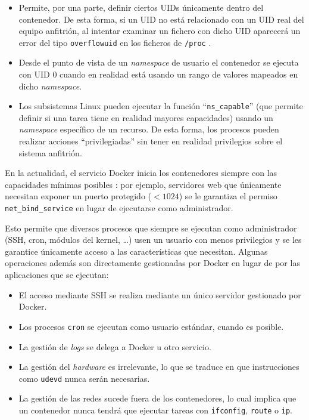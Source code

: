 \begin{itemize}
  \item Permite, por una parte, definir ciertos UIDs únicamente dentro del
        contenedor. De esta forma, si un UID no está relacionado con un UID real
        del equipo anfitrión, al intentar examinar un fichero con dicho UID
        aparecerá un error del tipo \texttt{overflowuid} en los ficheros
        de \texttt{/proc} \autocite{DocumentationProcSys}.
  \item Desde el punto de vista de un \textit{namespace} de usuario el contenedor 
        se ejecuta con UID $0$ cuando en realidad está usando un rango de valores
        mapeados en dicho \textit{namespace}.
  \item Los subsistemas Linux pueden ejecutar la función ``\lstinline[style=C]!ns_capable!''
        (que permite definir si una tarea tiene en realidad mayores capacidades) usando un \textit{namespace} específico de un recurso. De esta forma,
        los procesos pueden realizar acciones ``privilegiadas'' sin tener en
        realidad privilegios sobre el sistema anfitrión.
\end{itemize}

En la actualidad, el servicio Docker inicia los contenedores siempre con las
capacidades mínimas posibles \autocite{DockerSecurity2021}: por ejemplo,
servidores web que únicamente necesitan exponer un puerto protegido ($< 1024$)
se le garantiza el permiso \texttt{net\_bind\_service} en lugar de ejecutarse
como administrador.

Esto permite que diversos procesos que siempre se ejecutan como administrador
(SSH, cron, módulos del kernel, \dots) usen un usuario con menos privilegios
y se les garantice únicamente acceso a las características que necesitan. Algunas
operaciones además son directamente gestionadas por Docker en lugar de por
las aplicaciones que se ejecutan:

\begin{itemize}
  \item El acceso mediante SSH se realiza mediante un único servidor gestionado por Docker.
  \item Los procesos \texttt{cron} se ejecutan como usuario estándar, cuando es posible.
  \item La gestión de \textit{logs} se delega a Docker u otro servicio.
  \item La gestión del \textit{hardware} es irrelevante, lo que se traduce en que
        instrucciones como \texttt{udevd} nunca serán necesarias.
  \item La gestión de las redes sucede fuera de los contenedores, lo cual implica
        que un contenedor nunca tendrá que ejecutar tareas con \texttt{ifconfig},
        \texttt{route} o \texttt{ip}.
\end{itemize}

